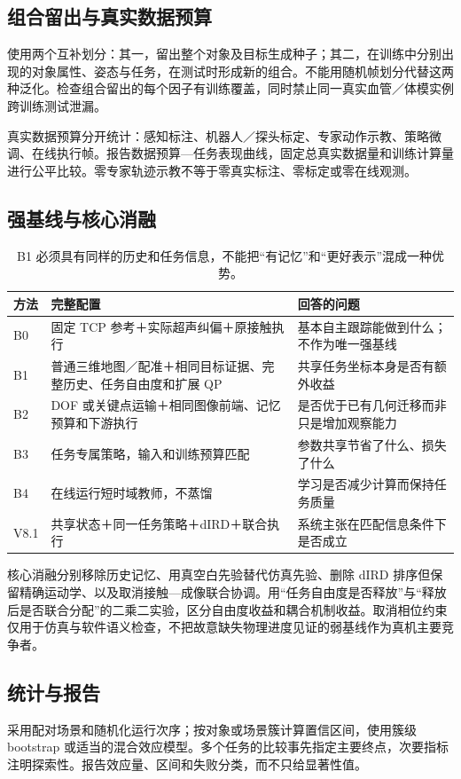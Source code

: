 \documentclass[UTF8,11pt,a4paper,fontset=fandol]{ctexart}
\numberwithin{equation}{section}
\theoremstyle{definition}
\begin{document}
\subsection{组合留出与真实数据预算}
使用两个互补划分：其一，留出整个对象及目标生成种子；其二，在训练中分别出现的对象属性、姿态与任务，在测试时形成新的组合。不能用随机帧划分代替这两种泛化。检查组合留出的每个因子有训练覆盖，同时禁止同一真实血管／体模实例跨训练测试泄漏。

真实数据预算分开统计：感知标注、机器人／探头标定、专家动作示教、策略微调、在线执行帧。报告数据预算—任务表现曲线，固定总真实数据量和训练计算量进行公平比较。零专家轨迹示教不等于零真实标注、零标定或零在线观测。

\subsection{强基线与核心消融}
\begin{table}[htbp]\centering\small
\begin{tabularx}{\linewidth}{P{17mm}YY}
\toprule
方法 & 完整配置 & 回答的问题\\\midrule
B0 & 固定 TCP 参考＋实际超声纠偏＋原接触执行 & 基本自主跟踪能做到什么；不作为唯一强基线\\
B1 & 普通三维地图／配准＋相同目标证据、完整历史、任务自由度和扩展 QP & 共享任务坐标本身是否有额外收益\\
B2 & DOF 或关键点运输＋相同图像前端、记忆预算和下游执行 & 是否优于已有几何迁移而非只是增加观察能力\\
B3 & 任务专属策略，输入和训练预算匹配 & 参数共享节省了什么、损失了什么\\
B4 & 在线运行短时域教师，不蒸馏 & 学习是否减少计算而保持任务质量\\
V8.1 & 共享状态＋同一任务策略＋dIRD＋联合执行 & 系统主张在匹配信息条件下是否成立\\\bottomrule
\end{tabularx}
\caption{B1 必须具有同样的历史和任务信息，不能把“有记忆”和“更好表示”混成一种优势。}
\end{table}

核心消融分别移除历史记忆、用真空白先验替代仿真先验、删除 dIRD 排序但保留精确运动学、以及取消接触—成像联合协调。用“任务自由度是否释放”与“释放后是否联合分配”的二乘二实验，区分自由度收益和耦合机制收益。取消相位约束仅用于仿真与软件语义检查，不把故意缺失物理进度见证的弱基线作为真机主要竞争者。

\subsection{统计与报告}
采用配对场景和随机化运行次序；按对象或场景簇计算置信区间，使用簇级 bootstrap 或适当的混合效应模型。多个任务的比较事先指定主要终点，次要指标注明探索性。报告效应量、区间和失败分类，而不只给显著性值。
\end{document}
